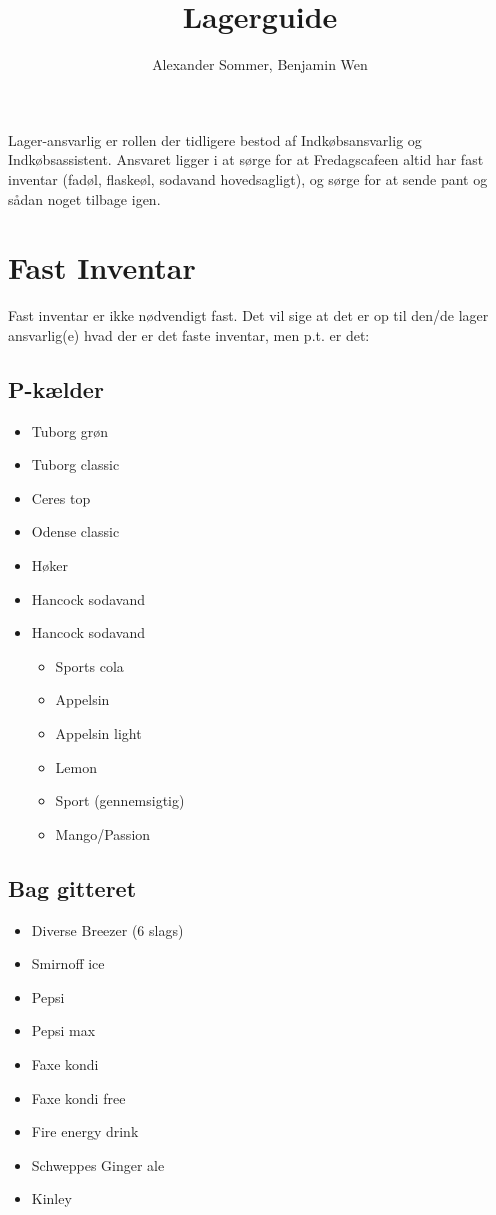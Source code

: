 

\title{Lagerguide}
\author{Alexander Sommer, Benjamin Wen}
\date{}



\maketitle

Lager-ansvarlig er rollen der tidligere bestod af Indkøbsansvarlig og Indkøbsassistent. Ansvaret ligger i at sørge for at Fredagscafeen altid har fast inventar (fadøl, flaskeøl, sodavand hovedsagligt), og sørge for at sende pant og sådan noget tilbage igen.
\section{Fast Inventar}
Fast inventar er ikke nødvendigt fast. Det vil sige at det er op til den/de lager ansvarlig(e) hvad der er det faste inventar, men p.t. er det: 
\subsection{P-kælder}
\begin{itemize}
    \item Tuborg grøn
    \item Tuborg classic 
    \item Ceres top 
    \item Odense classic
    \item Høker
    \item Hancock sodavand
    \item Hancock sodavand 
    \begin{itemize}
        \item Sports cola 
        \item Appelsin 
        \item Appelsin light 
        \item Lemon 
        \item Sport (gennemsigtig)
        \item Mango/Passion
    \end{itemize}
\end{itemize}
\subsection{Bag gitteret}
\begin{itemize}
    \item Diverse Breezer (6 slags)
    \item Smirnoff ice 
    \item Pepsi 
    \item Pepsi max
    \item Faxe kondi
    \item Faxe kondi free
    \item Fire energy drink
    \item Schweppes Ginger ale
    \item Kinley
\end{itemize}
